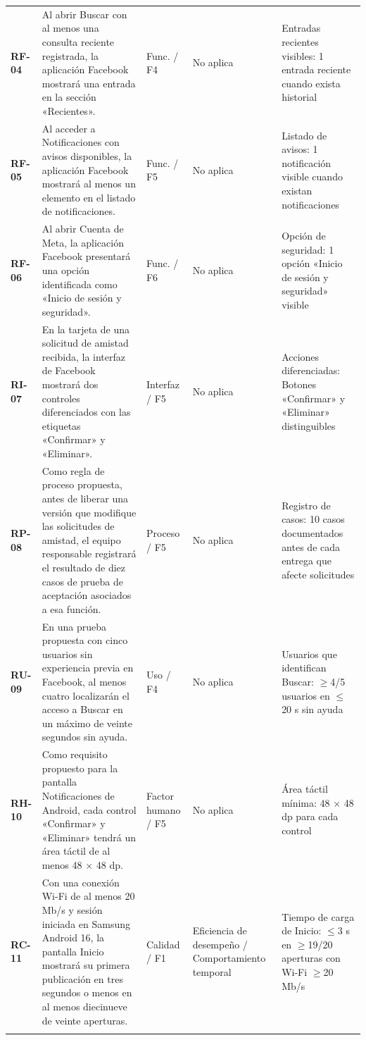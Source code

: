 \documentclass[11pt,a4paper]{article}
\begin{document}
{\begin{longtable}{@{}p{1.0cm}p{7.0cm}>{\RaggedRight\arraybackslash}p{1.65cm}>{\RaggedRight\arraybackslash}p{3.3cm}>{\RaggedRight\arraybackslash}p{3.55cm}@{}}
\textbf{RF-04} & Al abrir Buscar con al menos una consulta reciente registrada, la aplicación Facebook mostrará una entrada en la sección «Recientes». & Func. / F4 & No aplica & Entradas recientes visibles: 1 entrada reciente cuando exista historial\\\addlinespace[3pt]
\textbf{RF-05} & Al acceder a Notificaciones con avisos disponibles, la aplicación Facebook mostrará al menos un elemento en el listado de notificaciones. & Func. / F5 & No aplica & Listado de avisos: 1 notificación visible cuando existan notificaciones\\\addlinespace[3pt]
\textbf{RF-06} & Al abrir Cuenta de Meta, la aplicación Facebook presentará una opción identificada como «Inicio de sesión y seguridad». & Func. / F6 & No aplica & Opción de seguridad: 1 opción «Inicio de sesión y seguridad» visible\\\addlinespace[3pt]
\textbf{RI-07} & En la tarjeta de una solicitud de amistad recibida, la interfaz de Facebook mostrará dos controles diferenciados con las etiquetas «Confirmar» y «Eliminar». & Interfaz / F5 & No aplica & Acciones diferenciadas: Botones «Confirmar» y «Eliminar» distinguibles\\\addlinespace[3pt]
\textbf{RP-08} & Como regla de proceso propuesta, antes de liberar una versión que modifique las solicitudes de amistad, el equipo responsable registrará el resultado de diez casos de prueba de aceptación asociados a esa función. & Proceso / F5 & No aplica & Registro de casos: 10 casos documentados antes de cada entrega que afecte solicitudes\\\addlinespace[3pt]
\textbf{RU-09} & En una prueba propuesta con cinco usuarios sin experiencia previa en Facebook, al menos cuatro localizarán el acceso a Buscar en un máximo de veinte segundos sin ayuda. & Uso / F4 & No aplica & Usuarios que identifican Buscar: $\geq$4/5 usuarios en $\leq$20 s sin ayuda\\\addlinespace[3pt]
\textbf{RH-10} & Como requisito propuesto para la pantalla Notificaciones de Android, cada control «Confirmar» y «Eliminar» tendrá un área táctil de al menos 48 $\times$ 48 dp. & Factor humano / F5 & No aplica & Área táctil mínima: 48 $\times$ 48 dp para cada control\\\addlinespace[3pt]
\textbf{RC-11} & Con una conexión Wi-Fi de al menos 20 Mb/s y sesión iniciada en Samsung Android 16, la pantalla Inicio mostrará su primera publicación en tres segundos o menos en al menos diecinueve de veinte aperturas. & Calidad / F1 & Eficiencia de desempeño / Comportamiento temporal & Tiempo de carga de Inicio: $\leq$3 s en $\geq$19/20 aperturas con Wi-Fi $\geq$20 Mb/s\\\addlinespace[3pt]

\end{longtable}}
\end{document}
